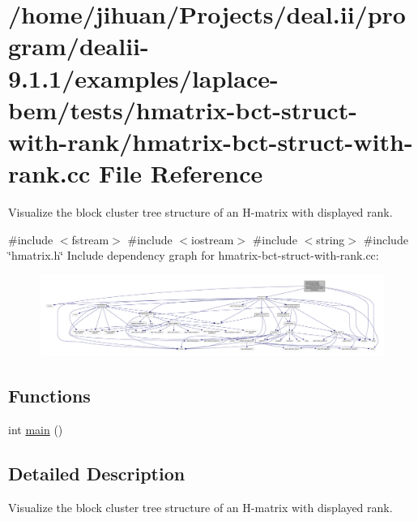 \hypertarget{hmatrix-bct-struct-with-rank_8cc}{}\section{/home/jihuan/\+Projects/deal.ii/program/dealii-\/9.1.1/examples/laplace-\/bem/tests/hmatrix-\/bct-\/struct-\/with-\/rank/hmatrix-\/bct-\/struct-\/with-\/rank.cc File Reference}
\label{hmatrix-bct-struct-with-rank_8cc}


Visualize the block cluster tree structure of an H-\/matrix with displayed rank.  


{\ttfamily \#include $<$fstream$>$}\newline
{\ttfamily \#include $<$iostream$>$}\newline
{\ttfamily \#include $<$string$>$}\newline
{\ttfamily \#include \char`\"{}hmatrix.\+h\char`\"{}}\newline
Include dependency graph for hmatrix-\/bct-\/struct-\/with-\/rank.cc\+:
\nopagebreak
\begin{figure}[H]
\begin{center}
\leavevmode
\includegraphics[width=350pt]{hmatrix-bct-struct-with-rank_8cc__incl}
\end{center}
\end{figure}
\subsection*{Functions}
\begin{DoxyCompactItemize}
\item 
int \hyperlink{hmatrix-bct-struct-with-rank_8cc_ae66f6b31b5ad750f1fe042a706a4e3d4}{main} ()
\end{DoxyCompactItemize}


\subsection{Detailed Description}
Visualize the block cluster tree structure of an H-\/matrix with displayed rank. 

